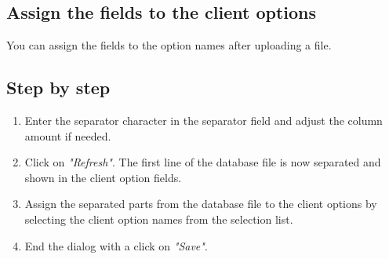 \subsection{Assign the fields to the client options}
You can assign the fields to the option names after uploading a file.\\
\subsection{Step by step}
\begin{enumerate}
\item Enter the separator character in the separator field and adjust the column amount if needed.\\
\item Click on \textit{"Refresh"}. The first line of the database file is now separated and shown in the client option fields.\\
\item Assign the separated parts from the database file to the client options by selecting the client option names from the selection list.\\
\item End the dialog with a click on \textit{"Save"}.\\
\end{enumerate}
